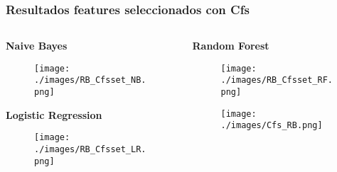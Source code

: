 \documentclass[10pt]{beamer}
\begin{document}
\begin{frame}[c, squeeze] \frametitle{Resultados features seleccionados con Cfs}
 \scriptsize
 \begin{columns}\begin{column}{0.5\textwidth}
\begin{center}
 \textbf{Naive Bayes} 
 \begin{figure}
 \centering
 \texttt{[image: ./images/RB\_Cfsset\_NB.png]}
\end{figure}
\textbf{Logistic Regression} %
\begin{figure}
 \centering
 \texttt{[image: ./images/RB\_Cfsset\_LR.png]}
\end{figure}
\end{center}
\end{column}
\begin{column}{0.5\textwidth}
\begin{center}
\textbf{Random Forest} %
\begin{figure}
 \centering
 \texttt{[image: ./images/RB\_Cfsset\_RF.png]}
\end{figure}

\begin{figure}
 \centering
 \texttt{[image: ./images/Cfs\_RB.png]}
\end{figure}

\end{center} 
\end{column}
\end{columns}
\end{frame}
\end{document}
